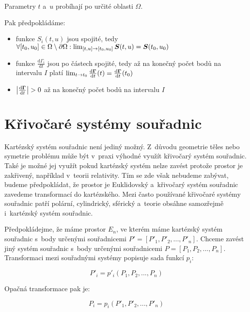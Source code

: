 Parametry \(t\) a~\(u\) probíhají po určité oblasti \(\Omega\).

Pak předpokládáme:

\begin{itemize}
\item funkce \(S_i(t, u)\) jsou spojité, tedy \(\forall [t_0, u_0] \in \Omega \setminus \partial \Omega: \lim_{[t, u] \to [t_0, u_0]} \boldsymbol{S}(t, u) = \boldsymbol{S}(t_0, u_0)\)
\item funkce \(\frac{\mathrm{d}\Gamma_i}{\mathrm{d}t}\) jsou po částech spojité, tedy až na konečný počet bodů na intervalu \(I\) platí \(\lim_{t \to t_0} \frac{\mathrm{d}\boldsymbol{\Gamma}}{\mathrm{d}t}(t) = \frac{\mathrm{d}\boldsymbol{\Gamma}}{\mathrm{d}t}(t_0)\)
\item \(\left|\frac{\mathrm{d}\boldsymbol{\Gamma}}{\mathrm{d}t} \right| > 0\) až na konečný počet bodů na intervalu \(I\)
\end{itemize}



\section{Křivočaré systémy souřadnic}

Kartézský systém souřadnic není jediný možný. Z~důvodu geometrie těles nebo symetrie problému může být v~praxi výhodné využít křivočarý systém souřadnic. Také je možné jej využít pokud kartézský systém nelze zavést protože prostor je zakřivený, například v~teorii relativity. Tím se zde však nebudeme zabývat, budeme předpokládat, že prostor je Euklidovský a~křivočarý systém souřadnic zavedeme transformací do kartézského. Mezi často používané křivočaré systémy souřadnic patří polární, cylindrický, sférický a~teorie obsáhne samozřejmě i~kartézský systém souřadnic.

Předpokládejme, že máme prostor \(E_n\), ve kterém máme kartézský systém souřadnic s~body určenými souřadnicemi \(P' = [P'_1, P'_2, ..., P'_n]\). Chceme zavést jiný systém souřadnic s~body určenými souřadnicemi \(P = [P_1, P_2, ..., P_n]\). Transformaci mezi souřadnými systémy popisuje sada funkcí \(p_i\):

\begin{equation}
P'_i = p'_i(P_1, P_2, ..., P_n)
\end{equation}

Opačná transformace pak je:

\begin{equation}
P_i = p_i(P'_1, P'_2, ..., P'_n)
\end{equation}

